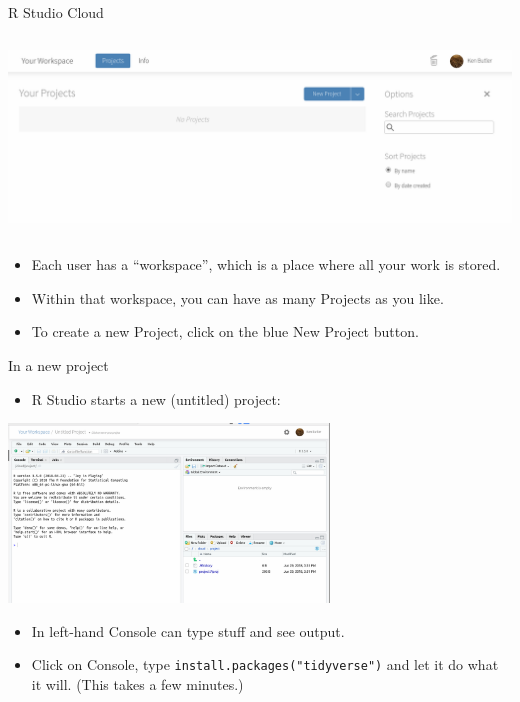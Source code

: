 \documentclass[ignorenonframetext,]{beamer}
\providecommand{\tightlist}{%
  \setlength{\itemsep}{0pt}\setlength{\parskip}{0pt}}
\begin{document}
\begin{frame}{R Studio Cloud}
\protect\hypertarget{r-studio-cloud}{}

\includegraphics[width=\textwidth,height=2.08333in]{Screenshot_2018-06-29_15-24-21.png}

\begin{itemize}
\tightlist
\item
  Each user has a ``workspace'', which is a place where all your work is
  stored.
\item
  Within that workspace, you can have as many Projects as you like.
\item
  To create a new Project, click on the blue New Project button.
\end{itemize}

\end{frame}

\begin{frame}{In a new project}
\protect\hypertarget{in-a-new-project}{}

\begin{itemize}
\tightlist
\item
  R Studio starts a new (untitled) project:
\end{itemize}

\includegraphics[width=\textwidth,height=1.875in]{Screenshot_2018-06-29_15-32-48.png}

\begin{itemize}
\tightlist
\item
  In left-hand Console can type stuff and see output.
\item
  Click on Console, type \texttt{install.packages("tidyverse")} and let
  it do what it will. (This takes a few minutes.)
\end{itemize}

\end{frame}
\end{document}
